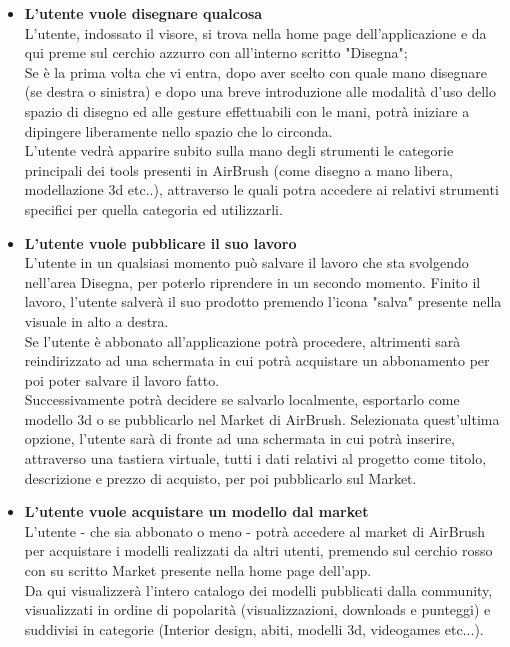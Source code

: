 \documentclass[11pt,fleqn]{book} %
\begin{document}
\begin{itemize}
\item\textbf{L'utente vuole disegnare qualcosa}\\
L'utente, indossato il visore, si trova nella home page dell'applicazione e da qui preme sul cerchio azzurro con all'interno scritto "Disegna";\\
Se è la prima volta che vi entra, dopo aver scelto con quale mano disegnare (se destra o sinistra) e dopo una breve introduzione alle modalità d'uso dello spazio di disegno ed alle gesture effettuabili con le mani, potrà iniziare a dipingere liberamente nello spazio che lo circonda.\\
L'utente vedrà apparire subito sulla mano degli strumenti le categorie principali dei tools presenti in AirBrush (come disegno a mano libera, modellazione 3d etc..), attraverso le quali potra accedere ai relativi strumenti specifici per quella categoria ed utilizzarli.
\item\textbf{L'utente vuole pubblicare il suo lavoro}\\
L'utente in un qualsiasi momento può salvare il lavoro che sta svolgendo nell'area Disegna, per poterlo riprendere in un secondo momento. Finito il lavoro, l'utente salverà il suo prodotto premendo l'icona "salva" presente nella visuale in alto a destra.\\
Se l'utente è abbonato all'applicazione potrà procedere, altrimenti sarà reindirizzato ad una schermata in cui potrà acquistare un abbonamento per poi poter salvare il lavoro fatto.\\
Successivamente potrà decidere se salvarlo localmente, esportarlo come modello 3d o se pubblicarlo nel Market di AirBrush. Selezionata quest'ultima opzione, l'utente sarà di fronte ad una schermata in cui potrà inserire, attraverso una tastiera virtuale, tutti i dati relativi al progetto come titolo, descrizione e prezzo di acquisto, per poi pubblicarlo sul Market.
\item\textbf{L'utente vuole acquistare un modello dal market}\\
L'utente - che sia abbonato o meno - potrà accedere al market di AirBrush per acquistare i modelli realizzati da altri utenti, premendo sul cerchio rosso con su scritto Market presente nella home page dell'app.\\
Da qui visualizzerà l'intero catalogo dei modelli pubblicati dalla community, visualizzati in ordine di popolarità (visualizzazioni, downloads e punteggi) e suddivisi in categorie (Interior design, abiti, modelli 3d, videogames etc...).\\

\end{itemize}
\end{document}
